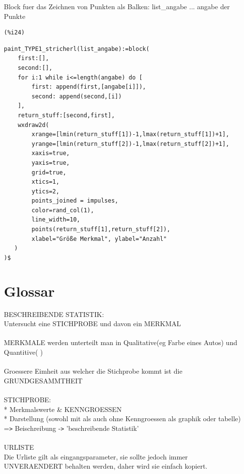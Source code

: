 \documentclass[12pt]{article}
\begin{document}
Block fuer das Zeichnen von Punkten als Balken:
    list\_angabe ... angabe der Punkte

\noindent
\begin{minipage}[t]{8ex}{\color{red}\bf
\begin{verbatim}
(%i24) 
\end{verbatim}}
\end{minipage}
\begin{minipage}[t]{\textwidth}{\color{blue}
\begin{verbatim}
paint_TYPE1_stricherl(list_angabe):=block(
    first:[],
    second:[],
    for i:1 while i<=length(angabe) do [
        first: append(first,[angabe[i]]),
        second: append(second,[i])
    ],
    return_stuff:[second,first],
    wxdraw2d(
        xrange=[lmin(return_stuff[1])-1,lmax(return_stuff[1])+1], 
        yrange=[lmin(return_stuff[2])-1,lmax(return_stuff[2])+1], 
        xaxis=true, 
        yaxis=true, 
        grid=true, 
        xtics=1, 
        ytics=2,
        points_joined = impulses,
        color=rand_col(1),
        line_width=10,
        points(return_stuff[1],return_stuff[2]),
        xlabel="Größe Merkmal", ylabel="Anzahl"
   )
)$
\end{verbatim}}
\end{minipage}


\section{Glossar}


BESCHREIBENDE STATISTIK: \\
    Untersucht eine STICHPROBE und davon ein MERKMAL
 \\ \\
MERKMALE werden unterteilt man in Qualitative(eg Farbe eines Autos) und Quantitive( )
\\ \\
Groessere Eimheit aus welcher die Stichprobe kommt ist die GRUNDGESAMMTHEIT
\\ \\
STICHPROBE: \\
    * Merkmalswerte \& KENNGROESSEN \\
    * Darstellung (sowohl mit als auch ohne Kenngroessen als graphik oder tabelle) \\
       =\verb|>| Beischreibung -\verb|>| 'beschreibende Statistik' \\ \\

URLISTE      \\
   Die Urliste gilt als eingangsparameter, sie sollte jedoch immer UNVERAENDERT behalten werden, daher wird sie einfach kopiert. \\
\end{document}
